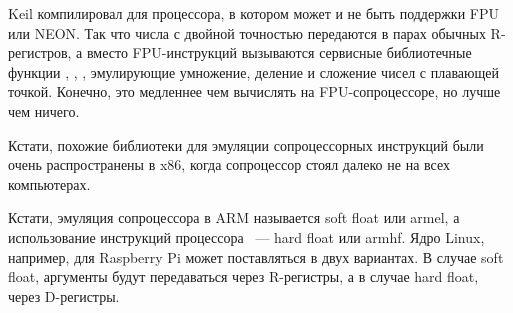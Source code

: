 

Keil компилировал для процессора, в котором может и не быть поддержки FPU или NEON. 
Так что числа с двойной точностью передаются в парах обычных R-регистров, 
а вместо FPU-инструкций вызываются сервисные
библиотечные функции , , , эмулирующие 
умножение, деление и сложение чисел с плавающей точкой. 
Конечно, это медленнее чем вычислять на FPU-сопроцессоре, но лучше чем ничего.

Кстати, похожие библиотеки для эмуляции сопроцессорных инструкций были очень распространены в x86, 
когда сопроцессор стоял далеко не на всех компьютерах.

Кстати, эмуляция сопроцессора в ARM называется soft float или armel, а использование инструкций процессора ~--- 
hard float или armhf. Ядро Linux, например, для Raspberry Pi может поставляться в двух вариантах. В случае soft float,
аргументы будут передаваться через R-регистры, а в случае hard float, через D-регистры.
